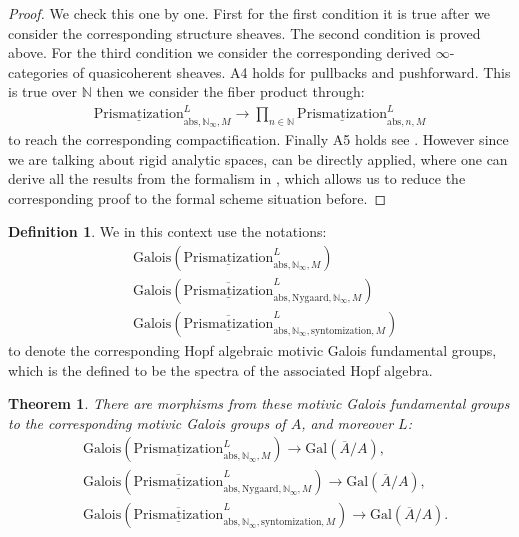 \documentclass[12pt]{article}
\newtheorem{theorem}{Theorem}
\theoremstyle{definition}
\newtheorem{definition}{Definition}
\begin{document}
\begin{proof}
We check this one by one. First for the first condition it is true after we consider the corresponding structure sheaves. The second condition is proved above. For the third condition we consider the corresponding derived $\infty$-categories of quasicoherent sheaves. A4 holds for pullbacks and pushforward. This is true over $\mathbb{N}$ then we consider the fiber product through:
\begin{align}
{\underline{\mathrm{Prismatization}}}^L_{\mathrm{abs},\mathbb{N}_\infty,M}\rightarrow  \prod_{n\in \mathbb{N}} {\underline{\mathrm{Prismatization}}}^L_{\mathrm{abs},n,M}
\end{align}
to reach the corresponding compactification. Finally A5 holds see \cite[Chapter 4, in particular 4.7, 4.8, 4.9, 4.10]{3A}. However since we are talking about rigid analytic spaces, \cite{3A} can be directly applied, where one can derive all the results from the formalism in \cite{3A}, which allows us to reduce the corresponding proof to the formal scheme situation before. 
\end{proof}


\begin{definition}
We in this context use the notations:
\begin{align}
&\mathrm{Galois}(\underline{\mathrm{Prismatization}}^L_{\mathrm{abs},\mathbb{N}_\infty,M})\\
&\mathrm{Galois}(\overline{\underline{\mathrm{Prismatization}}}^L_{\mathrm{abs},\mathrm{Nygaard},\mathbb{N}_\infty,M})\\
&\mathrm{Galois}(\overline{\underline{\mathrm{Prismatization}}}^L_{\mathrm{abs},\mathbb{N}_\infty,\mathrm{syntomization},M})
\end{align}
to denote the corresponding Hopf algebraic motivic Galois fundamental groups, which is the defined to be the spectra of the associated Hopf algebra.
\end{definition}


\begin{theorem}
There are morphisms from these motivic Galois fundamental groups to the corresponding motivic Galois groups of $A$, and moreover $L$: 
\begin{align}
&\mathrm{Galois}(\underline{\mathrm{Prismatization}}^L_{\mathrm{abs},\mathbb{N}_\infty,M})\rightarrow \mathrm{Gal}(\overline{A}/A),\\
&\mathrm{Galois}(\overline{\underline{\mathrm{Prismatization}}}^L_{\mathrm{abs},\mathrm{Nygaard},\mathbb{N}_\infty,M})\rightarrow \mathrm{Gal}(\overline{A}/A),\\
&\mathrm{Galois}(\overline{\underline{\mathrm{Prismatization}}}^L_{\mathrm{abs},\mathbb{N}_\infty,\mathrm{syntomization},M})\rightarrow \mathrm{Gal}(\overline{A}/A).
\end{align}
\end{theorem}
\end{document}
